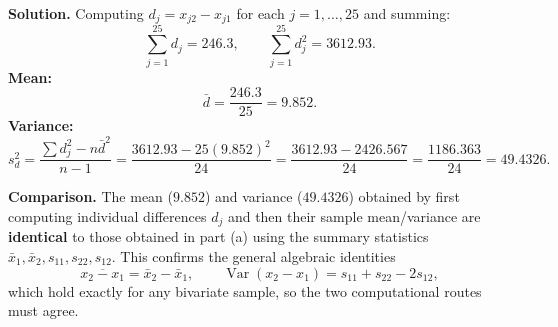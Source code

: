 \documentclass[11pt]{article}
\newenvironment{sol}{\par\noindent\textbf{Solution.}\quad}{\par\medskip}
\begin{document}
\begin{sol}
Computing $d_j = x_{j2}-x_{j1}$ for each $j=1,\dots,25$ and summing:
\[
\sum_{j=1}^{25} d_j = 246.3, \qquad \sum_{j=1}^{25} d_j^2 = 3612.93.
\]
\textbf{Mean:}
\[
\bar d = \frac{246.3}{25} = 9.852.
\]
\textbf{Variance:}
\[
s_d^2 = \frac{\sum d_j^2 - n\bar d^2}{n-1} = \frac{3612.93 - 25(9.852)^2}{24} = \frac{3612.93-2426.567}{24}=\frac{1186.363}{24} = \boxed{49.4326}.
\]

\textbf{Comparison.} The mean ($9.852$) and variance ($49.4326$) obtained by first computing individual differences $d_j$ and then their sample mean/variance are \textbf{identical} to those obtained in part (a) using the summary statistics $\bar x_1,\bar x_2,s_{11},s_{22},s_{12}$. This confirms the general algebraic identities
\[
\overline{x_2-x_1} = \bar x_2 - \bar x_1, \qquad \operatorname{Var}(x_2-x_1)=s_{11}+s_{22}-2s_{12},
\]
which hold exactly for any bivariate sample, so the two computational routes must agree.
\end{sol}
\end{document}
